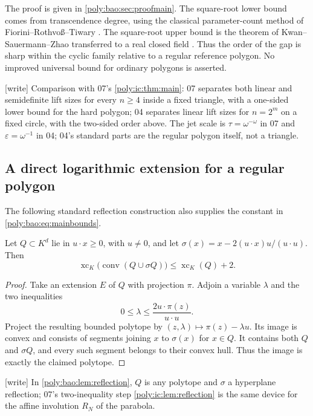 \documentclass[11pt,a4paper]{article}
\numberwithin{equation}{section}
\theoremstyle{plain}
\newcommand{\wtag}{\textup{[write]}}%
\newcommand{\eps}{\varepsilon}
\newcommand{\conv}{\operatorname{conv}}
\newcommand{\xc}{\operatorname{xc}}
\begin{document}
The proof is given in \cref{poly:bao:sec:proofmain}. The square-root lower bound
comes from transcendence degree, using the classical parameter-count
method of Fiorini--Rothvo\ss--Tiwary \cite{ic:frt}. The square-root upper bound
is the theorem of Kwan--Sauermann--Zhao transferred to a real closed field
\cite{bao:KSZ}. Thus the order of the gap is sharp within the cyclic family
relative to a regular reference polygon. No improved universal bound for
ordinary polygons is asserted.

\wtag{} Comparison with 07's \cref{poly:ic:thm:main}: 07 separates both
linear and semidefinite lift sizes for every $n\geq4$ inside a fixed
triangle, with a one-sided lower bound for the hard polygon; 04 separates
linear lift sizes for $n=2^m$ on a fixed circle, with the two-sided order
above. The jet scale is $\tau=\omega^{-\omega}$ in 07 and $\eps=\omega^{-1}$
in 04; 04's standard parts are the regular polygon itself, not a triangle.

\subsection{A direct logarithmic extension for a regular polygon}
The following standard reflection construction \cite{ic:kp} also supplies the
constant in \eqref{poly:bao:eq:mainbounds}.

\begin{lemma}\label{poly:bao:lem:reflection}
Let $Q\subset K^d$ lie in $u\cdot x\geq0$, with $u\neq0$, and let
$\sigma(x)=x-2(u\cdot x)u/(u\cdot u)$. Then
\[
 \xc_K\bigl(\conv(Q\cup\sigma Q)\bigr)\leq\xc_K(Q)+2.
\]
\end{lemma}
\begin{proof}
Take an extension $E$ of $Q$ with projection $\pi$. Adjoin a variable
$\lambda$ and the two inequalities
\[
 0\leq\lambda\leq\frac{2u\cdot\pi(z)}{u\cdot u}.
\]
Project the resulting bounded polytope by
$(z,\lambda)\mapsto\pi(z)-\lambda u$. Its image is convex and consists of
segments joining $x$ to $\sigma(x)$ for $x\in Q$. It contains both $Q$ and
$\sigma Q$, and every such segment belongs to their convex hull. Thus the
image is exactly the claimed polytope.
\end{proof}

\wtag{} In \cref{poly:bao:lem:reflection}, $Q$ is any polytope and $\sigma$
a hyperplane reflection; 07's two-inequality step
\cref{poly:ic:lem:reflection} is the same device for the affine involution
$R_N$ of the parabola.
\end{document}
